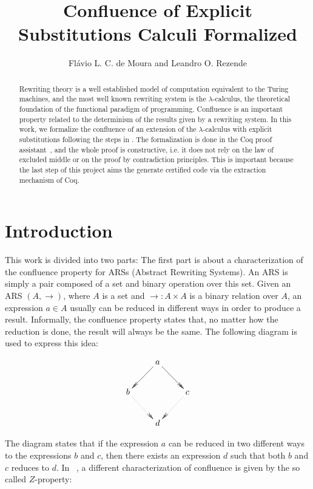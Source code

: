 \documentclass{llncs}
\title{Confluence of Explicit Substitutions Calculi Formalized}
\author{Flávio L. C. de Moura and Leandro O. Rezende}
\institute{Departamento de Ciência da Computação, Universidade de Brasília}
\begin{document}
\maketitle

\begin{abstract}
  Rewriting theory is a well established model of computation
  equivalent to the Turing machines, and the most well known rewriting
  system is the $\lambda$-calculus, the theoretical foundation of the
  functional paradigm of programming. Confluence is an important
  property related to the determinism of the results given by a
  rewriting system. In this work, we formalize the confluence of an
  extension of the $\lambda$-calculus with explicit substitutions
  following the steps in \cite{kes09}. The formalization is done in
  the Coq proof assistant~\cite{CoqTeam}, and the whole proof is
  constructive, i.e. it does not rely on the law of excluded middle or
  on the proof by contradiction principles. This is important because
  the last step of this project aims the generate certified code via
  the extraction mechanism of Coq.
\end{abstract}

\section{Introduction}

This work is divided into two parts: The first part is about a
characterization of the confluence property for ARSs (Abstract
Rewriting Systems). An ARS is simply a pair composed of a set and
binary operation over this set. Given an ARS $(A,\to)$, where $A$ is a
set and $\to:A\times A$ is a binary relation over $A$, an expression
$a\in A$ usually can be reduced in different ways in order to produce
a result. Informally, the confluence property states that, no matter
how the reduction is done, the result will always be the same. The
following diagram is used to express this idea:

\[
  \xymatrix{
    & a \ar@{->>}[dl] \ar@{->>}[dr] & \\
    b \ar@{.>>}[dr] &  & c \ar@{.>>}[dl] \\
    & d & 
  }
\]

The diagram states that if the expression $a$ can be reduced in two
different ways to the expressions $b$ and $c$, then there exists an
expression $d$ such that both $b$ and $c$ reduces to $d$. In
~\cite{ZPropertyDraft}, a different characterization of confluence is
given by the so called $Z$-property:
\end{document}
